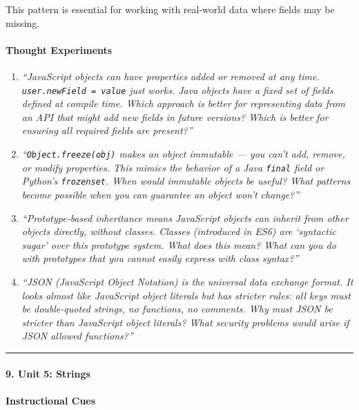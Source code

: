 \documentclass[
  justified,
  openright,
]{tufte-book}
\let\subsection\paragraph
\let\paragraph\paragraph
\let\subsection\paragraph
\let\paragraph\paragraph
\begin{document}
This pattern is essential for working with real-world data where fields
may be missing.

\paragraph{Thought Experiments}\label{thought-experiments-23}

\begin{enumerate}
\def\labelenumi{\arabic{enumi}.}
\item
  \emph{``JavaScript objects can have properties added or removed at any
  time.
  \texttt{user.newField\ =\ \textquotesingle{}value\textquotesingle{}}
  just works. Java objects have a fixed set of fields defined at compile
  time. Which approach is better for representing data from an API that
  might add new fields in future versions? Which is better for ensuring
  all required fields are present?''}
\item
  \emph{``\texttt{Object.freeze(obj)} makes an object immutable --- you
  can't add, remove, or modify properties. This mimics the behavior of a
  Java \texttt{final} field or Python's \texttt{frozenset}. When would
  immutable objects be useful? What patterns become possible when you
  can guarantee an object won't change?''}
\item
  \emph{``Prototype-based inheritance means JavaScript objects can
  inherit from other objects directly, without classes. Classes
  (introduced in ES6) are `syntactic sugar' over this prototype system.
  What does this mean? What can you do with prototypes that you cannot
  easily express with class syntax?''}
\item
  \emph{``JSON (JavaScript Object Notation) is the universal data
  exchange format. It looks almost like JavaScript object literals but
  has stricter rules: all keys must be double-quoted strings, no
  functions, no comments. Why must JSON be stricter than JavaScript
  object literals? What security problems would arise if JSON allowed
  functions?''}
\end{enumerate}

\begin{center}\rule{0.5\linewidth}{0.5pt}\end{center}

\subsection{9. Unit 5: Strings}\label{unit-5-strings}

\paragraph{Instructional Cues}\label{instructional-cues-17}
\end{document}
